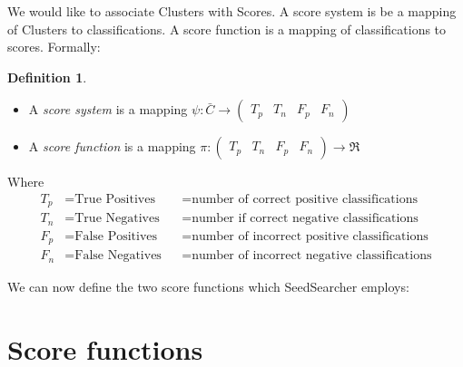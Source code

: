 \documentclass{amsart}
\theoremstyle{definition}
\newtheorem*{score}{Definition}
\theoremstyle{remark}
\theoremstyle{definition}
\theoremstyle{remark}
\begin{document}
We would like to associate Clusters with Scores.
A score system is be a mapping of Clusters to classifications.
A score function is a mapping of classifications to scores.
Formally:

\newcommand{\tpfn}{\left(\begin{smallmatrix} T_p & T_n & F_p & F_n \end{smallmatrix}\right)}

\begin{score} 
\mbox{}
\begin{itemize}
\item []A \emph{score system} is a mapping $\psi:\bar{C} \to \tpfn$
\item []A \emph{score function} is a mapping $\pi:\tpfn \to \Re$
\end{itemize}
Where 
\begin{align*}
T_p & = \text{True Positives}  &  & = \text{number of correct positive classifications} \\
T_n & = \text{True Negatives}  &  & = \text{number if correct negative classifications} \\
F_p & = \text{False Positives} &  & = \text{number of incorrect positive classifications}	\\
F_n & = \text{False Negatives} &  & = \text{number of incorrect negative classifications}	
\end{align*}
\end{score}

We can now define the two score functions which SeedSearcher employs:

\section{Score functions}
\end{document}
